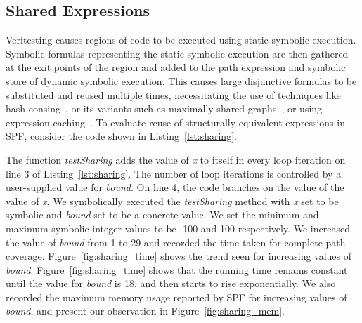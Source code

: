 \subsection{Shared Expressions}
Veritesting causes regions of code to be executed using static symbolic execution.
%
Symbolic formulas representing the static symbolic execution are then gathered at the exit points of the region and added to the path expression and symbolic store of dynamic symbolic execution.
%
This causes large disjunctive formulas to be substituted and reused multiple times, necessitating the use of techniques like hash consing~\cite{hashconsing}, or its variants such as maximally-shared graphs~\cite{babic}, or using expression caching~\cite{green}.
%
To evaluate reuse of structurally equivalent expressions in SPF, consider the code shown in Listing~\ref{lst:sharing}.
%

%
The function \textit{testSharing} adds the value of \textit{x} to itself in every loop iteration on line 3 of Listing~\ref{lst:sharing}.
%
The number of loop iterations is controlled by a user-supplied value for \textit{bound}.
%
On line 4, the code branches on the value of the value of \textit{x}.
%
We symbolically executed the \textit{testSharing} method with \textit{x} set to be symbolic and \textit{bound} set to be a concrete value.
%
We set the minimum and maximum symbolic integer values to be -100 and 100 respectively.
%
We increased the value of \textit{bound} from 1 to 29 and recorded the time taken for complete path coverage.
%
Figure~\ref{fig:sharing_time} shows the trend seen for increasing values of \textit{bound}.
%
Figure~\ref{fig:sharing_time} shows that the running time remains constant until the value for \textit{bound} is 18, and then starts to rise exponentially. 
%
We also recorded the maximum memory usage reported by SPF for increasing values of \textit{bound}, and present our observation in Figure~\ref{fig:sharing_mem}.

